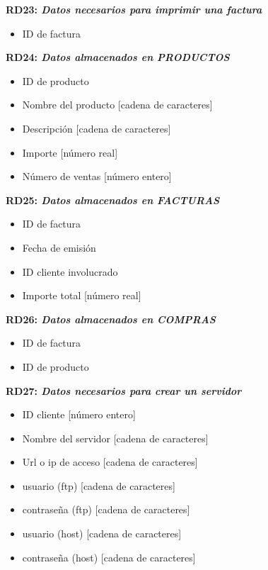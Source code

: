 \documentclass[paper=a4, fontsize=11pt, spanish]{scrartcl}
\begin{document}
	\setlength{\parindent}{0em}
	\textbf{RD23: \textit{Datos necesarios para imprimir una factura}}
	\setlength{\parindent}{2em}
	\begin{itemize}
		\item ID de factura
	\end{itemize}
	
	\setlength{\parindent}{0em}
	\textbf{RD24: \textit{Datos almacenados en PRODUCTOS}}
	\setlength{\parindent}{2em}
	\begin{itemize}
		\item ID de producto
		\item Nombre del producto [cadena de caracteres]
		\item Descripción [cadena de caracteres]
		\item Importe [número real]
		\item Número de ventas [número entero]
	\end{itemize}
	
	\setlength{\parindent}{0em}
	\textbf{RD25: \textit{Datos almacenados en FACTURAS}}
	\setlength{\parindent}{2em}
	\begin{itemize}
		\item ID de factura
		\item Fecha de emisión 
		\item ID cliente involucrado
		\item Importe total [número real]
	\end{itemize}
	
	\setlength{\parindent}{0em}
	\textbf{RD26: \textit{Datos almacenados en COMPRAS}}
	\setlength{\parindent}{2em}
	\begin{itemize}
		\item ID de factura
		\item ID de producto
	\end{itemize}

\setlength{\parindent}{0em}
\textbf{RD27: \textit{Datos necesarios para crear un servidor}}
\setlength{\parindent}{2em}
\begin{itemize}
  \item ID cliente [número entero]
  \item Nombre del servidor [cadena de caracteres]
  \item Url o ip de acceso [cadena de caracteres]
  \item usuario (ftp) [cadena de caracteres]
  \item contraseña (ftp) [cadena de caracteres]
  \item usuario (host) [cadena de caracteres]
  \item contraseña (host) [cadena de caracteres]
\end{itemize}
\end{document}
